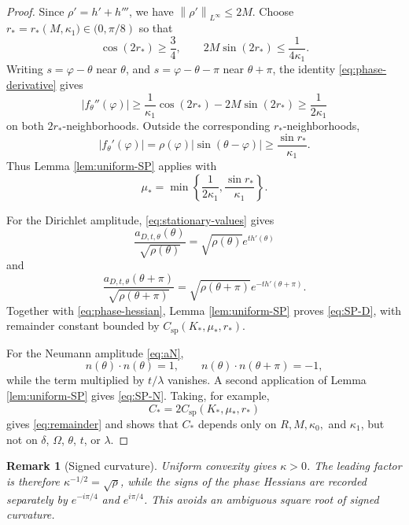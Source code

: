 \documentclass[12pt]{article}
\numberwithin{equation}{section}
\newtheorem{remark}[theorem]{Remark}
\numberwithin{equation}{section}
\begin{document}
\begin{proof}
Since $\rho'=h'+h'''$, we have $\left\|\rho'\right\|_{L^\infty}\leq2M$.  Choose
$r_*=r_*\left(M,\kappa_1)\in(0,\pi/8\right)$ so that
\begin{equation*}\label{eq:r-star}
 \cos\left(2r_*\right)\geq\frac34,
 \qquad 2M\sin\left(2r_*\right)\leq\frac{1}{4\kappa_1}.
\end{equation*}
Writing $s=\varphi-\theta$ near $\theta$, and
$s=\varphi-\theta-\pi$ near $\theta+\pi$, the identity
\eqref{eq:phase-derivative} gives
\begin{equation*}\label{eq:local-hessian-uniform}
 \left|f_\theta''(\varphi)\right|
 \geq \frac{1}{\kappa_1}\cos\left(2r_*\right)
       -2M\sin\left(2r_*\right)
 \geq\frac{1}{2\kappa_1}
\end{equation*}
on both $2r_*$-neighborhoods. Outside the corresponding
$r_*$-neighborhoods,
\begin{equation*}\label{eq:nonstationary-uniform}
 \left|f_\theta'(\varphi)\right|
 =\rho(\varphi)|\sin(\theta-\varphi)|
 \geq \frac{\sin r_*}{\kappa_1}.
\end{equation*}
Thus Lemma \ref{lem:uniform-SP} applies with
\begin{equation*}\label{eq:mu-star}
 \mu_*=\min\left\{\frac{1}{2\kappa_1},
                  \frac{\sin r_*}{\kappa_1}\right\}.
\end{equation*}

For the Dirichlet amplitude, \eqref{eq:stationary-values} gives
\[
\frac{a_{D,t,\theta}(\theta)}{\sqrt{\rho(\theta)}}
=\sqrt{\rho(\theta)}e^{t h'(\theta)}
\]
and
\[
\frac{a_{D,t,\theta}(\theta+\pi)}
{\sqrt{\rho(\theta+\pi)}}
=\sqrt{\rho(\theta+\pi)}e^{-t h'(\theta+\pi)}.
\]
Together with \eqref{eq:phase-hessian}, Lemma \ref{lem:uniform-SP} proves
\eqref{eq:SP-D}, with remainder constant bounded by
$C_{\mathrm{sp}}\left(K_*,\mu_*,r_*\right)$.

For the Neumann amplitude \eqref{eq:aN},
\[
n(\theta)\cdot n(\theta)=1,\qquad
n(\theta)\cdot n(\theta+\pi)=-1,
\]
while the term multiplied by $t/\lambda$ vanishes. A second application of
Lemma \ref{lem:uniform-SP} gives \eqref{eq:SP-N}. Taking, for example,
\[
 C_*=2C_{\mathrm{sp}}\left(K_*,\mu_*,r_*\right)
\]
gives \eqref{eq:remainder} and shows that $C_*$ depends only on
$R,M,\kappa_0,$ and $\kappa_1$, but not on $\delta$, $\Omega$, $\theta$,
$t$, or $\lambda$.
\end{proof}

\begin{remark}[Signed curvature]
\emph{Uniform convexity gives $\kappa>0$. The leading factor is therefore
$\kappa^{-1/2}=\sqrt{\rho}$, while the signs of the phase Hessians are
recorded separately by $e^{-i\pi/4}$ and $e^{i\pi/4}$. This avoids an
ambiguous square root of signed curvature.}
\end{remark}
\end{document}
